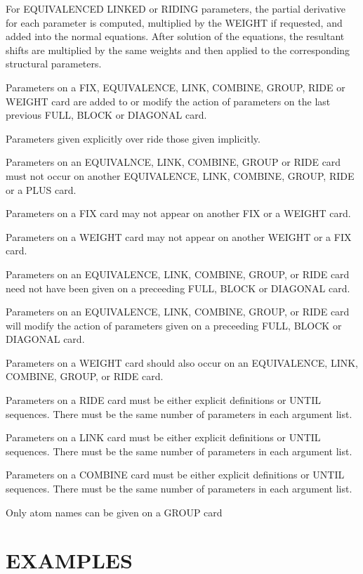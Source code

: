 \documentclass[10pt,a4paper]{report}
\begin{document}
For EQUIVALENCED LINKED or RIDING parameters, the partial derivative for each
 parameter is computed, multiplied by the WEIGHT if requested, and added into
 the normal equations. After solution of the equations, the resultant shifts
 are multiplied by the same weights and then applied to the corresponding 
 structural parameters.


\bigskip{}




Parameters on a FIX, EQUIVALENCE,  LINK, COMBINE, GROUP,
 RIDE or WEIGHT card are added to or modify
 the action of parameters on the last previous FULL, BLOCK or DIAGONAL card.


Parameters given explicitly over ride those given implicitly.


Parameters on an EQUIVALNCE, LINK, COMBINE, GROUP
  or RIDE card must not occur on another
 EQUIVALENCE, LINK, COMBINE, GROUP,  RIDE or a PLUS card.


Parameters on a FIX card may not appear on another FIX or a WEIGHT card.


Parameters on a WEIGHT card may not appear on another WEIGHT or a FIX card.


Parameters on an EQUIVALENCE, LINK, COMBINE, GROUP,
  or RIDE card need not have been  given on a
 preceeding FULL, BLOCK or DIAGONAL card.


Parameters on an EQUIVALENCE, LINK, COMBINE, GROUP,
  or RIDE card will modify the action of
 parameters given on a preceeding FULL, BLOCK or DIAGONAL card.


Parameters on a WEIGHT card should also occur on an EQUIVALENCE, LINK,
 COMBINE, GROUP,  or
 RIDE card.


Parameters on a RIDE card must be either explicit definitions or UNTIL
 sequences. There must be the same number of parameters in each argument
 list.


Parameters on a LINK card must be either explicit definitions or UNTIL
 sequences. There must be the same number of parameters in each argument
 list.


Parameters on a COMBINE card must be either explicit definitions or UNTIL
 sequences. There must be the same number of parameters in each argument
 list.


Only atom names can be given on a GROUP card



\section{EXAMPLES}
\end{document}
